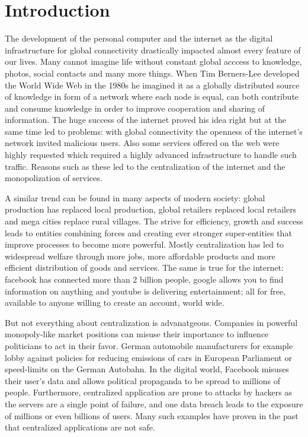 \chapter{Introduction}
The development of the personal computer and the internet as the digital infrastructure for global
connectivity drastically impacted almost every feature of our lives. Many cannot imagine life 
without constant global acccess to knowledge, photos, social contacts and many more things. When
Tim Berners-Lee developed the World Wide Web in the 1980s he imagined it as a globally distributed
source of knowledge in form of a network where each node is equal, can both contribute and consume
knowledge in order to improve cooperation and sharing of information. The huge success of the 
internet proved his idea right but at the same time led to problems: with global connectivity the
openness of the internet's network invited malicious users. Also some services offered on the web 
were highly requested which required a highly advanced infrastructure to handle such traffic. 
Reasons such as these led to the centralization of the internet and the monopolization of services.

A similar trend can be found in many aspects of modern society: global production has replaced
local production, global retailers replaced local retailers and mega cities replace rural villages.
The strive for efficiency, growth and success leads to entities combining forces and creating ever
stronger super-entities that improve processes to become more powerful. Mostly centralization has
led to widespread welfare through more jobs, more affordable products and more efficient distribution
of goods and services. The same is true for the internet: facebook has connected more than 2 billion
people, google allows you to find information on anything and youtube is delivering entertainment;
all for free, available to anyone willing to create an account, world wide. 

But not everything about centralization is advanatgeous. Companies in powerful monopoly-like market
positions can misuse their importance to influence politicians to act in their favor. German 
automobile manufacturers for example lobby against policies for reducing emissions of cars in 
European Parliament or speed-limits on the German Autobahn. In the digital world, Facebook misuses
their user's data and allows political propaganda to be spread to millions of people. Furthermore,
centralized application are prone to attacks by hackers as the servers are a single point of 
failure, and one data breach leads to the exposure of millions or even billions of users. Many
such examples have proven in the past that centralized applications are not safe.

